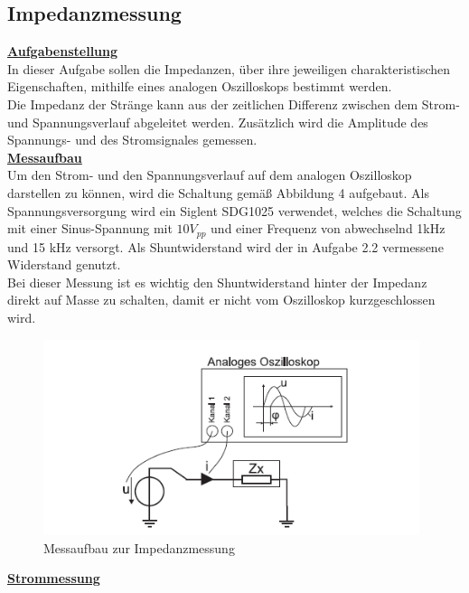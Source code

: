 \documentclass[a4paper,12pt]{article}
\begin{document}
	\subsection{Impedanzmessung}
	\underline{\textbf{Aufgabenstellung}} \\ \newline
	\noindent
	In dieser Aufgabe sollen die Impedanzen, über ihre jeweiligen charakteristischen Eigenschaften, mithilfe eines analogen Oszilloskops bestimmt werden. \\ \newline
	Die Impedanz der Stränge kann aus der zeitlichen Differenz zwischen dem Strom- und Spannungsverlauf abgeleitet werden. Zusätzlich wird die Amplitude des Spannungs- und des Stromsignales gemessen.\\ \newline
	\noindent
	\underline{\textbf{Messaufbau}}
	\\ \newline
	Um den Strom- und den Spannungsverlauf auf dem analogen Oszilloskop darstellen zu können, wird die Schaltung gemäß Abbildung 4 aufgebaut. Als Spannungsversorgung wird ein Siglent SDG1025 verwendet, welches die Schaltung mit einer Sinus-Spannung mit $10V_{pp}$ und einer Frequenz von abwechselnd 1kHz und 15 kHz versorgt. Als Shuntwiderstand wird der in Aufgabe 2.2 vermessene Widerstand genutzt.\\ \newline
	Bei dieser Messung ist es wichtig den Shuntwiderstand hinter der Impedanz direkt auf Masse zu schalten, damit er nicht vom Oszilloskop kurzgeschlossen wird.\newline
	\begin{figure}[h]
		\centering
		\includegraphics[width=11cm]{assets/impedanzmessung}
		\caption{Messaufbau zur Impedanzmessung}
	\end{figure} \newline
	\noindent
	\underline{\textbf{Strommessung}}\\ \newline
\end{document}
